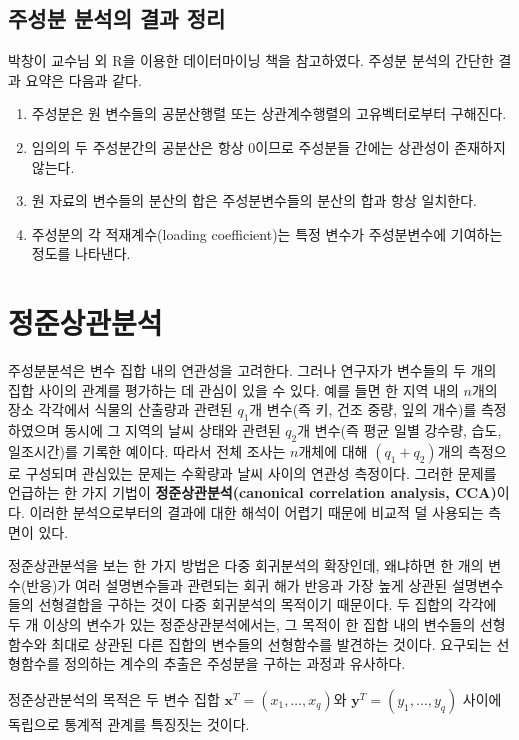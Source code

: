 \documentclass[b5paper,]{scrbook}
\theoremstyle{plain}
\theoremstyle{definition}
\numberwithin{equation}{section}
\begin{document}
\section{주성분 분석의 결과 정리}\label{---}

박창이 교수님 외 R을 이용한 데이터마이닝 책을 참고하였다. 주성분 분석의
간단한 결과 요약은 다음과 같다.

\begin{enumerate}
\def\labelenumi{\arabic{enumi}.}
\item
  주성분은 원 변수들의 공분산행렬 또는 상관계수행렬의 고유벡터로부터
  구해진다.
\item
  임의의 두 주성분간의 공분산은 항상 0이므로 주성분들 간에는 상관성이
  존재하지 않는다.
\item
  원 자료의 변수들의 분산의 합은 주성분변수들의 분산의 합과 항상
  일치한다.
\item
  주성분의 각 적재계수(loading coefficient)는 특정 변수가 주성분변수에
  기여하는 정도를 나타낸다.
\end{enumerate}

\chapter{정준상관분석}\label{CCA}

주성분분석은 변수 집합 내의 연관성을 고려한다. 그러나 연구자가 변수들의
두 개의 집합 사이의 관계를 평가하는 데 관심이 있을 수 있다. 예를 들면 한
지역 내의 \(n\)개의 장소 각각에서 식물의 산출량과 관련된 \(q_{1}\)개
변수(즉 키, 건조 중량, 잎의 개수)를 측정하였으며 동시에 그 지역의 날씨
상태와 관련된 \(q_{2}\)개 변수(즉 평균 일별 강수량, 습도, 일조시간)를
기록한 예이다. 따라서 전체 조사는 \(n\)개체에 대해 \((q_{1}+q_{2})\)개의
측정으로 구성되며 관심있는 문제는 수확량과 날씨 사이의 연관성 측정이다.
그러한 문제를 언급하는 한 가지 기법이 \textbf{정준상관분석(canonical
correlation analysis, CCA)}이다. 이러한 분석으로부터의 결과에 대한
해석이 어렵기 때문에 비교적 덜 사용되는 측면이 있다.

정준상관분석을 보는 한 가지 방법은 다중 회귀분석의 확장인데, 왜냐하면 한
개의 변수(반응)가 여러 설명변수들과 관련되는 회귀 해가 반응과 가장 높게
상관된 설명변수들의 선형결합을 구하는 것이 다중 회귀분석의 목적이기
때문이다. 두 집합의 각각에 두 개 이상의 변수가 있는 정준상관분석에서는,
그 목적이 한 집합 내의 변수들의 선형함수와 최대로 상관된 다른 집합의
변수들의 선형함수를 발견하는 것이다. 요구되는 선형함수를 정의하는 계수의
추출은 주성분을 구하는 과정과 유사하다.

정준상관분석의 목적은 두 변수 집합
\(\mathbf{x}^{T}=(x_{1},\ldots, x_{q})\)와
\(\mathbf{y}^{T}=(y_{1},\ldots, y_{q})\) 사이에 독립으로 통계적 관계를
특징짓는 것이다.
\end{document}
